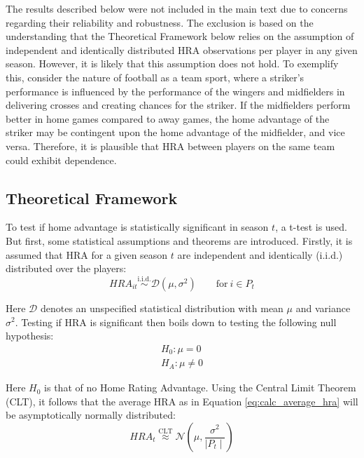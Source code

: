 The results described below were not included in the main text due to concerns regarding their reliability and robustness. The exclusion is based on the understanding that the Theoretical Framework below relies on the assumption of independent and identically distributed HRA observations per player in any given season. However, it is likely that this assumption does not hold. To exemplify this, consider the nature of football as a team sport, where a striker's performance is influenced by the performance of the wingers and midfielders in delivering crosses and creating chances for the striker. If the midfielders perform better in home games compared to away games, the home advantage of the striker may be contingent upon the home advantage of the midfielder, and vice versa. Therefore, it is plausible that HRA between players on the same team could exhibit dependence.

\subsection*{Theoretical Framework}
To test if home advantage is statistically significant in season $t$, a t-test is used. But first, some statistical assumptions and theorems are introduced. Firstly, it is assumed that HRA for a given season $t$ are independent and identically (i.i.d.) distributed over the players:
\begin{equation}
    \label{eq:iid}
    HRA_{it} \overset{\text{i.i.d.}}{\sim} \mathcal{D}(\mu, \sigma^2) \qquad \text{for} \ i \in P_t
\end{equation}

\noindent
Here $\mathcal{D}$ denotes an unspecified statistical distribution with mean $\mu$ and variance $\sigma^2$. Testing if HRA is significant then boils down to testing the following null hypothesis:
\begin{equation}
    \label{eq:hypotheses}
    \begin{aligned}
    H_0: \mu = 0\\
    H_A: \mu \neq 0
    \end{aligned}
\end{equation}

\noindent
Here $H_0$ is that of no Home Rating Advantage. Using the Central Limit Theorem (CLT), it follows that the average HRA as in Equation \eqref{eq:calc_average_hra} will be asymptotically normally distributed:
\begin{equation}
    \label{eq:clt}
    HRA_t \overset{\text{CLT}}{\approx} \mathcal{N}(\mu, \frac{\sigma^2}{\mid P_t \mid})
\end{equation}

